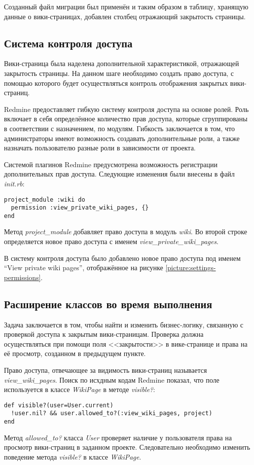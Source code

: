Созданный файл миграции был применён и таким образом в таблицу, хранящую данные
о вики-страницах, добавлен столбец отражающий закрытость страницы. 

\subsection{Система контроля доступа}
\label{section:access_control}
Вики-страница была наделена дополнительной характеристикой, отражающей
закрытость страницы. На данном шаге необходимо создать право доступа, с помощью
которого будет осуществляться контроль отображения закрытых вики-страниц. 

Redmine предоставляет гибкую систему контроля доступа на основе ролей. Роль
включает в себя определённое количество прав доступа, которые сгруппированы в
соответствии с назначением, по модулям. Гибкость заключается в том, что
администраторы имеют возможность создавать дополнительные роли, а также
назначать пользователю разные роли в зависимости от проекта.

Системой плагинов Redmine предусмотрена возможность регистрации дополнительных
прав доступа. Следующие изменения были внесены в файл \textit{init.rb}:
\small{
\begin{lstlisting}
project_module :wiki do
  permission :view_private_wiki_pages, {}
end
\end{lstlisting}}
Метод \textit{project\_module} добавляет право доступа в модуль \textit{wiki}.
Во второй строке определяется новое право доступа с именем
\textit{view\_private\_wiki\_pages}.


В систему контроля доступа было добавлено новое право доступа под именем ``View
private wiki pages'', отображённое на рисунке
\ref{picture:settings-permissions}.


\subsection{Расширение классов во время выполнения}
\label{section:metaprogramming} 
Задача заключается в том, чтобы найти и изменить бизнес-логику, связанную с
проверкой доступа к закрытым вики-страницам. Проверка должна осуществляться
при помощи поля <<закрытости>> в вике-странице и права на её просмотр,
созданном в предыдущем пункте.

Право доступа, отвечающее за видимость вики-страниц называется
\textit{view\_wiki\_pages}. Поиск по исхдным кодам Redmine показал, что поле
используется в классе \textit{WikiPage} в методе \textit{visible?}:
\small{\begin{lstlisting}
def visible?(user=User.current)
  !user.nil? && user.allowed_to?(:view_wiki_pages, project)
end
\end{lstlisting}}
Метод \textit{allowed\_to?} класса \textit{User} проверяет наличие у
пользователя права на просмотр вики-страниц в заданном проекте. Следовательно
необходимо изменить поведение метода \textit{visible?} в классе
\textit{WikiPage}.

